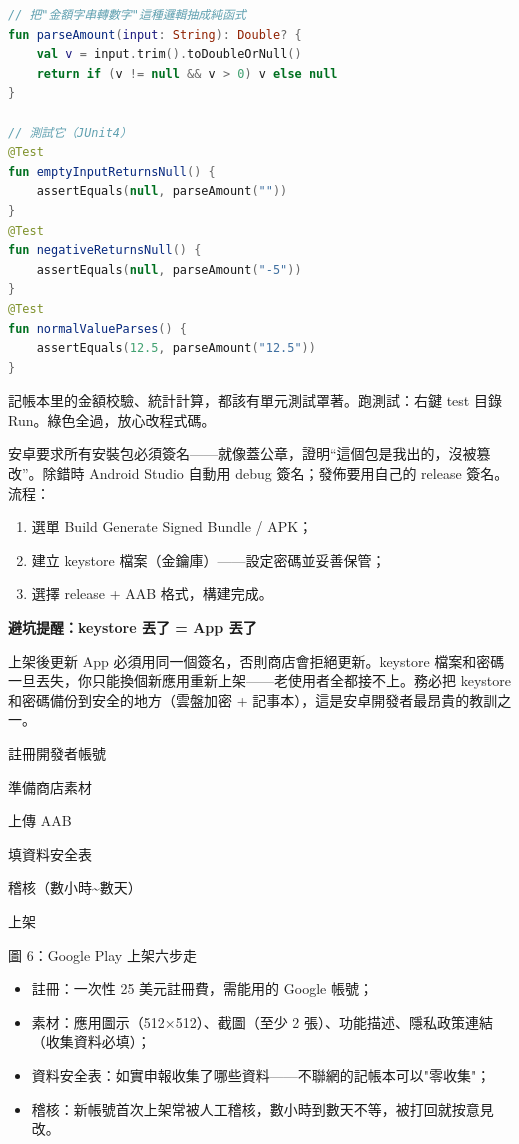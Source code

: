 \begin{lstlisting}[language=Kotlin]
// 把"金額字串轉數字"這種邏輯抽成純函式
fun parseAmount(input: String): Double? {
    val v = input.trim().toDoubleOrNull()
    return if (v != null && v > 0) v else null
}

// 測試它（JUnit4）
@Test
fun emptyInputReturnsNull() {
    assertEquals(null, parseAmount(""))
}
@Test
fun negativeReturnsNull() {
    assertEquals(null, parseAmount("-5"))
}
@Test
fun normalValueParses() {
    assertEquals(12.5, parseAmount("12.5"))
}
\end{lstlisting}

記帳本里的金額校驗、統計計算，都該有單元測試罩著。跑測試：右鍵 test 目錄 Run。綠色全過，放心改程式碼。


安卓要求所有安裝包必須簽名——就像蓋公章，證明“這個包是我出的，沒被篡改”。除錯時 Android Studio 自動用 debug 簽名；發佈要用自己的 release 簽名。流程：

\begin{enumerate}
  \item 選單 Build Generate Signed Bundle / APK；
  \item 建立 keystore 檔案（金鑰庫）——設定密碼並妥善保管；
  \item 選擇 release + AAB 格式，構建完成。
\end{enumerate}

\textbf{避坑提醒：keystore 丟了 = App 丟了}\par

上架後更新 App 必須用同一個簽名，否則商店會拒絕更新。keystore 檔案和密碼一旦丟失，你只能換個新應用重新上架——老使用者全都接不上。務必把 keystore 和密碼備份到安全的地方（雲盤加密 + 記事本），這是安卓開發者最昂貴的教訓之一。


註冊開發者帳號

準備商店素材

上傳 AAB

填資料安全表

稽核（數小時\textasciitilde{}數天）

上架

\begin{center}\small\color{gray}圖 6：Google Play 上架六步走\end{center}

\begin{itemize}
  \item 註冊：一次性 25 美元註冊費，需能用的 Google 帳號；
  \item 素材：應用圖示（512×512）、截圖（至少 2 張）、功能描述、隱私政策連結（收集資料必填）；
  \item 資料安全表：如實申報收集了哪些資料——不聯網的記帳本可以"零收集"；
  \item 稽核：新帳號首次上架常被人工稽核，數小時到數天不等，被打回就按意見改。
\end{itemize}

